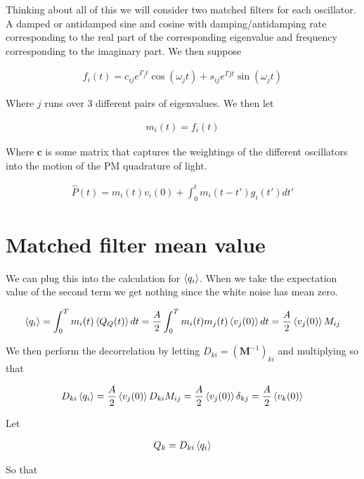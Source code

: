 \documentclass[12pt]{article}
\newcommand{\bv}[1]{\textbf{#1}}
\begin{document}
Thinking about all of this we will consider two matched filters for each oscillator. A damped or antidamped sine and cosine with damping/antidamping rate corresponding to the real part of the corresponding eigenvalue and frequency corresponding to the imaginary part. We then suppose

\begin{align}
f_i(t) = c_{ij}e^{\Gamma_j t} \cos(\omega_j t) + s_{ij} e^{\Gamma j t} \sin(\omega_j t)
\end{align}

Where $j$ runs over 3 different pairs of eigenvalues. We then let

\begin{align}
m_i(t) = f_i(t)
\end{align}

Where $\bv{c}$ is some matrix that captures the weightings of the different oscillators into the motion of the PM quadrature of light.

\begin{align}
\hat{P}(t) =  m_i(t)v_i(0) + \int_0^t m_i(t-t')g_i(t') dt'
\end{align}

\section{Matched filter mean value}

We can plug this into the calculation for $\braket{q_i}$. When we take the expectation value of the second term we get nothing since the white noise has mean zero.

\begin{align}
\braket{q_i} = \int_0^T m_i(t) \braket{Q_Q(t)} dt = \frac{A}{2}\int_0^T m_i(t) m_j(t)\braket{v_j(0)} dt = \frac{A}{2} \braket{v_j(0)} M_{ij}
\end{align}

We then perform the decorrelation by letting $D_{ki} = \left(\bv{M}^{-1}\right)_{ki}$ and multiplying so that 

\begin{align}
D_{ki} \braket{q_i} = \frac{A}{2} \braket{v_j(0)} D_{ki} M_{ij} = \frac{A}{2} \braket{v_j(0)} \delta_{kj} = \frac{A}{2} \braket{v_k(0)}
\end{align}

Let

\begin{align}
Q_{k} = D_{ki}\braket{q_i}
\end{align}

So that
\end{document}
